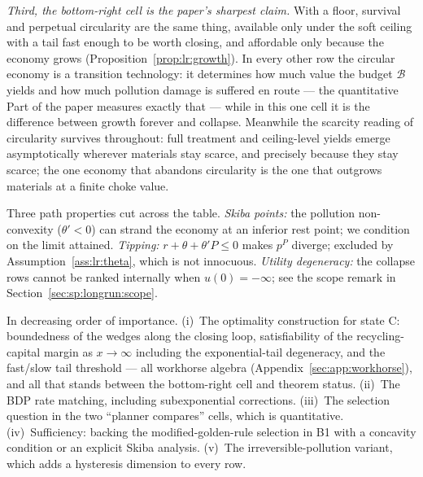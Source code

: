 \emph{Third, the bottom-right cell is the paper's sharpest claim.} With a floor, survival and perpetual circularity are the same thing, available only under the soft ceiling with a tail fast enough to be worth closing, and affordable only because the economy grows (Proposition~\ref{prop:lr:growth}). In every other row the circular economy is a transition technology: it determines how much value the budget $\mathcal B$ yields and how much pollution damage is suffered en route --- the quantitative Part of the paper measures exactly that --- while in this one cell it is the difference between growth forever and collapse. Meanwhile the scarcity reading of circularity survives throughout: full treatment and ceiling-level yields emerge asymptotically wherever materials stay scarce, and precisely because they stay scarce; the one economy that abandons circularity is the one that outgrows materials at a finite choke value.

 Three path properties cut across the table. \emph{Skiba points:} the pollution non-convexity ($\theta'<0$) can strand the economy at an inferior rest point; we condition on the limit attained. \emph{Tipping:} $r+\theta+\theta'P\le0$ makes $p^P$ diverge; excluded by Assumption~\ref{ass:lr:theta}, which is not innocuous. \emph{Utility degeneracy:} the collapse rows cannot be ranked internally when $u\left(0\right)=-\infty$; see the scope remark in Section~\ref{sec:sp:longrun:scope}.

 In decreasing order of importance. (i)~The optimality construction for state C: boundedness of the wedges along the closing loop, satisfiability of the recycling-capital margin as $x\to\infty$ including the exponential-tail degeneracy, and the fast/slow tail threshold --- all workhorse algebra (Appendix~\ref{sec:app:workhorse}), and all that stands between the bottom-right cell and theorem status. (ii)~The BDP rate matching, including subexponential corrections. (iii)~The selection question in the two ``planner compares'' cells, which is quantitative. (iv)~Sufficiency: backing the modified-golden-rule selection in B1 with a concavity condition or an explicit Skiba analysis. (v)~The irreversible-pollution variant, which adds a hysteresis dimension to every row.
